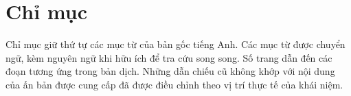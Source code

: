 \chapter*{Chỉ mục}
\setcounter{translatornote}{0}
Chỉ mục giữ thứ tự các mục từ của bản gốc tiếng Anh. Các mục từ được chuyển ngữ, kèm nguyên ngữ khi hữu ích để tra cứu song song. Số trang dẫn đến các đoạn tương ứng trong bản dịch. Những dẫn chiếu cũ không khớp với nội dung của ấn bản được cung cấp đã được điều chỉnh theo vị trí thực tế của khái niệm.
\medskip
\begingroup\small
\raggedright
\setlength{\parskip}{1.5pt}
\newcommand{\indexline}[2]{\par\begingroup\leftskip=#1em\parindent=0pt\hangindent=1em\hangafter=1 #2\par\endgroup}

